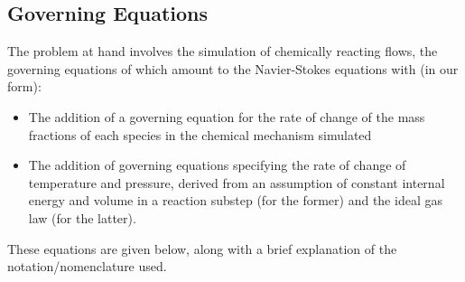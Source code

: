 

\subsection{Governing Equations}

The problem at hand involves the simulation of chemically reacting flows, the
governing equations of which amount to the Navier-Stokes equations with (in
our form):
\begin{itemize}
\item{The addition of a governing equation for the rate of change of the
      mass fractions of each species in the chemical mechanism simulated}
\item{The addition of governing equations specifying the rate of change of
      temperature and pressure, derived from an assumption of constant
      internal energy and volume in a reaction substep (for the former)
      and the ideal gas law (for the latter).}
\end{itemize}
These equations are given below, along with a brief explanation of the notation/nomenclature
used.

